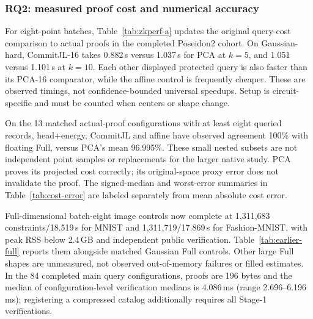 \subsubsection{RQ2: measured proof cost and numerical accuracy}
For eight-point batches, Table~\ref{tab:zkperf-a} updates the original query-cost comparison to actual proofs in the completed Poseidon2 cohort. On Gaussian-hard, CommitJL-16 takes 0.882\,s versus 1.037\,s for PCA at $k=5$, and 1.051 versus 1.101\,s at $k=10$. Each other displayed protected query is also faster than its PCA-16 comparator, while the affine control is frequently cheaper. These are observed timings, not confidence-bounded universal speedups. Setup is circuit-specific and must be counted when centers or shape change.



On the 13 matched actual-proof configurations with at least eight queried records, head+energy, CommitJL and affine have observed agreement 100\% with floating Full, versus PCA's mean 96.995\%. These small nested subsets are not independent point samples or replacements for the larger native study. PCA proves its projected cost correctly; its original-space proxy error does not invalidate the proof. The signed-median and worst-error summaries in Table~\ref{tab:cost-error} are labeled separately from mean absolute cost error.

Full-dimensional batch-eight image controls now complete at 1,311,683 constraints/18.519\,s for MNIST and 1,311,719/17.869\,s for Fashion-MNIST, with peak RSS below 2.4\,GB and independent public verification. Table~\ref{tab:earlier-full} reports them alongside matched Gaussian Full controls. Other large Full shapes are unmeasured, not observed out-of-memory failures or filled estimates. In the 84 completed main query configurations, proofs are 196 bytes and the median of configuration-level verification medians is 4.086\,ms (range 2.696--6.196\,ms); registering a compressed catalog additionally requires all Stage-1 verifications.


